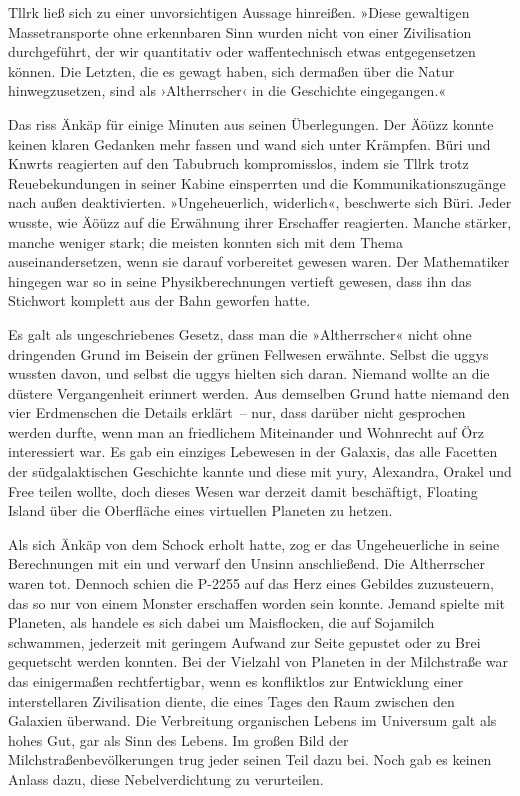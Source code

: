 Tllrk ließ sich zu einer unvorsichtigen Aussage hinreißen. »Diese gewaltigen Massetransporte ohne erkennbaren Sinn wurden nicht von einer Zivilisation durchgeführt, der wir quantitativ oder waffentechnisch etwas entgegensetzen können. Die Letzten, die es gewagt haben, sich dermaßen über die Natur hinwegzusetzen, sind als ›Altherrscher‹ in die Geschichte eingegangen.«

Das riss Änkäp für einige Minuten aus seinen Überlegungen. Der Äöüzz konnte keinen klaren Gedanken mehr fassen und wand sich unter Krämpfen. Büri und Knwrts reagierten auf den Tabubruch kompromisslos, indem sie Tllrk trotz Reuebekundungen in seiner Kabine einsperrten und die Kommunikationszugänge nach außen deaktivierten. »Ungeheuerlich, widerlich«, beschwerte sich Büri. Jeder wusste, wie Äöüzz auf die Erwähnung ihrer Erschaffer reagierten. Manche stärker, manche weniger stark; die meisten konnten sich mit dem Thema auseinandersetzen, wenn sie darauf vorbereitet gewesen waren. Der Mathematiker hingegen war so in seine Physikberechnungen vertieft gewesen, dass ihn das Stichwort komplett aus der Bahn geworfen hatte.

Es galt als ungeschriebenes Gesetz, dass man die »Altherrscher« nicht ohne dringenden Grund im Beisein der grünen Fellwesen erwähnte. Selbst die uggys wussten davon, und selbst die uggys hielten sich daran. Niemand wollte an die düstere Vergangenheit erinnert werden. Aus demselben Grund hatte niemand den vier Erdmenschen die Details erklärt~– nur, dass darüber nicht gesprochen werden durfte, wenn man an friedlichem Miteinander und Wohnrecht auf Örz interessiert war. Es gab ein einziges Lebewesen in der Galaxis, das alle Facetten der südgalaktischen Geschichte kannte und diese mit yury, Alexandra, Orakel und Free teilen wollte, doch dieses Wesen war derzeit damit beschäftigt, Floating Island über die Oberfläche eines virtuellen Planeten zu hetzen.

Als sich Änkäp von dem Schock erholt hatte, zog er das Ungeheuerliche in seine Berechnungen mit ein und verwarf den Unsinn anschließend. Die Altherrscher waren tot. Dennoch schien die P-2255 auf das Herz eines Gebildes zuzusteuern, das so nur von einem Monster erschaffen worden sein konnte. Jemand spielte mit Planeten, als handele es sich dabei um Maisflocken, die auf Sojamilch schwammen, jederzeit mit geringem Aufwand zur Seite gepustet oder zu Brei gequetscht werden konnten. Bei der Vielzahl von Planeten in der Milchstraße war das einigermaßen rechtfertigbar, wenn es konfliktlos zur Entwicklung einer interstellaren Zivilisation diente, die eines Tages den Raum zwischen den Galaxien überwand. Die Verbreitung organischen Lebens im Universum galt als hohes Gut, gar als Sinn des Lebens. Im großen Bild der Milchstraßenbevölkerungen trug jeder seinen Teil dazu bei. Noch gab es keinen Anlass dazu, diese Nebelverdichtung zu verurteilen.

